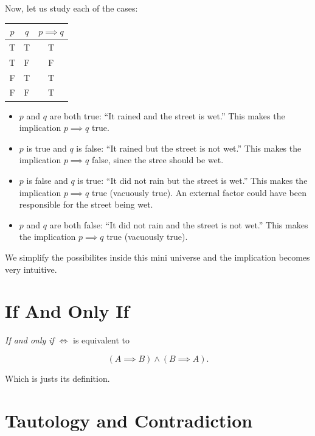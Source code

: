 Now, let us study each of the cases:

\begin{center}
	\begin{tabular}{|c|c|c|}
		\toprule
		\(p\) & \(q\) & \(p \implies q\) \\
		\midrule
		T     & T     & T                \\
		T     & F     & F                \\
		F     & T     & T                \\
		F     & F     & T                \\
		\bottomrule
	\end{tabular}
\end{center}

\begin{itemize}

	\item \(p\) and \(q\) are both true: ``It rained and the street is wet.'' This makes the implication \(p \implies q\) true.

	\item \(p\) is true and \(q\) is false: ``It rained but the street is not wet.'' This makes the implication \(p \implies q\) false, since the stree should be wet.

	\item \(p\) is false and \(q\) is true: ``It did not rain but the street is wet.'' This makes the implication \(p \implies q\) true (vacuously true).
	      An external factor could have been responsible for the street being wet.

	\item \(p\) and \(q\) are both false: ``It did not rain and the street is not wet.'' This makes the implication \(p \implies q\) true (vacuously true).

\end{itemize}

We simplify the possibilites inside this mini universe and the implication becomes very intuitive.

\section{If And Only If}

\emph{If and only if} \(\iff\) is equivalent to

\[
	(A \implies B) \land (B \implies A).
\]

Which is justs its definition.

\section{Tautology and Contradiction}

